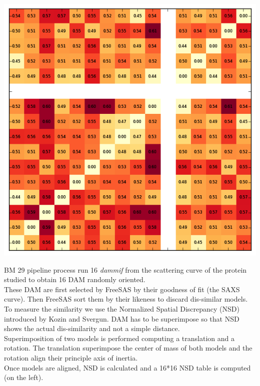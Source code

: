 \documentclass[11pt]{article}
\begin{document}
\vspace{-0.2cm}
\begin{minipage}{0.35\linewidth}
    \begin{flushleft}
    \includegraphics[scale=0.5]{nsdtable.png}
    \end{flushleft}
\end{minipage} \hfill
\begin{minipage}{0.60\linewidth}
    BM 29 pipeline process run 16 \textit{dammif} from the scattering curve 
    of the protein studied to obtain 16 DAM randomly oriented.\\
    These DAM are first selected by FreeSAS by their goodness of fit (the 
    SAXS curve). 
    Then FreeSAS sort them by their likeness to discard dis-similar models. 
    To measure the similarity we use the Normalized Spatial Discrepancy (NSD) 
    introduced by Kozin and Svergun. 
    DAM has to be superimpose so that NSD shows the actual dis-similarity and 
    not a simple distance.\\
    Superimposition of two models is performed computing a translation and a 
    rotation. 
    The translation superimpose the center of mass of both models and the 
    rotation align their principle axis of inertia.\\
    Once models are aligned, NSD is calculated and a 16*16 NSD table is 
    computed (on the left).
\end{minipage}
\end{document}
